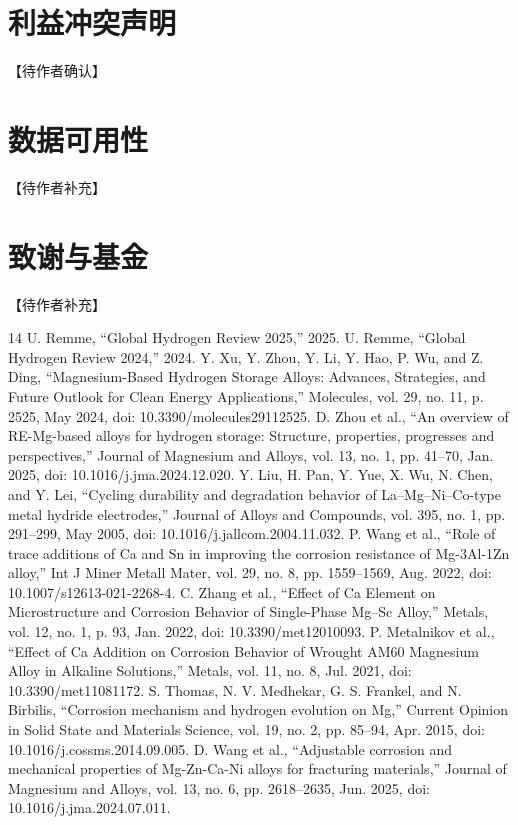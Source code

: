 \documentclass[preprint,12pt]{elsarticle}
\begin{document}
\section*{利益冲突声明}
【待作者确认】

\section*{数据可用性}
【待作者补充】

\section*{致谢与基金}
【待作者补充】

\begin{thebibliography}{14}
 U. Remme, “Global Hydrogen Review 2025,” 2025.
 U. Remme, “Global Hydrogen Review 2024,” 2024.
 Y. Xu, Y. Zhou, Y. Li, Y. Hao, P. Wu, and Z. Ding, “Magnesium-Based Hydrogen Storage Alloys: Advances, Strategies, and Future Outlook for Clean Energy Applications,” Molecules, vol. 29, no. 11, p. 2525, May 2024, doi: 10.3390/molecules29112525.
 D. Zhou et al., “An overview of RE-Mg-based alloys for hydrogen storage: Structure, properties, progresses and perspectives,” Journal of Magnesium and Alloys, vol. 13, no. 1, pp. 41–70, Jan. 2025, doi: 10.1016/j.jma.2024.12.020.
 Y. Liu, H. Pan, Y. Yue, X. Wu, N. Chen, and Y. Lei, “Cycling durability and degradation behavior of La–Mg–Ni–Co-type metal hydride electrodes,” Journal of Alloys and Compounds, vol. 395, no. 1, pp. 291–299, May 2005, doi: 10.1016/j.jallcom.2004.11.032.
 P. Wang et al., “Role of trace additions of Ca and Sn in improving the corrosion resistance of Mg-3Al-1Zn alloy,” Int J Miner Metall Mater, vol. 29, no. 8, pp. 1559–1569, Aug. 2022, doi: 10.1007/s12613-021-2268-4.
 C. Zhang et al., “Effect of Ca Element on Microstructure and Corrosion Behavior of Single-Phase Mg–Sc Alloy,” Metals, vol. 12, no. 1, p. 93, Jan. 2022, doi: 10.3390/met12010093.
 P. Metalnikov et al., “Effect of Ca Addition on Corrosion Behavior of Wrought AM60 Magnesium Alloy in Alkaline Solutions,” Metals, vol. 11, no. 8, Jul. 2021, doi: 10.3390/met11081172.
 S. Thomas, N. V. Medhekar, G. S. Frankel, and N. Birbilis, “Corrosion mechanism and hydrogen evolution on Mg,” Current Opinion in Solid State and Materials Science, vol. 19, no. 2, pp. 85–94, Apr. 2015, doi: 10.1016/j.cossms.2014.09.005.
 D. Wang et al., “Adjustable corrosion and mechanical properties of Mg-Zn-Ca-Ni alloys for fracturing materials,” Journal of Magnesium and Alloys, vol. 13, no. 6, pp. 2618–2635, Jun. 2025, doi: 10.1016/j.jma.2024.07.011.

\end{thebibliography}
\end{document}
